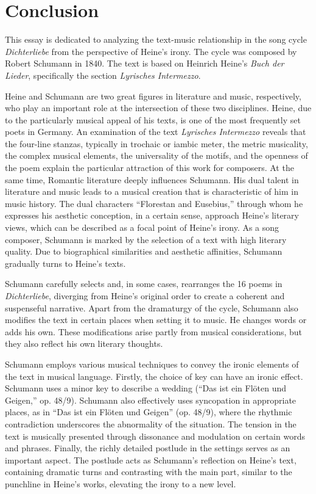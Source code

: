 \documentclass[10pt,a4paper,twocolumn]{rho}
\begin{document}
\section{Conclusion}
This essay is dedicated to analyzing the text-music relationship in the song cycle \textit{Dichterliebe} from the perspective of Heine's irony. The cycle was composed by Robert Schumann in 1840. The text is based on Heinrich Heine's \textit{Buch der Lieder}, specifically the section \textit{Lyrisches Intermezzo}.

Heine and Schumann are two great figures in literature and music, respectively, who play an important role at the intersection of these two disciplines. Heine, due to the particularly musical appeal of his texts, is one of the most frequently set poets in Germany. An examination of the text \textit{Lyrisches Intermezzo} reveals that the four-line stanzas, typically in trochaic or iambic meter, the metric musicality, the complex musical elements, the universality of the motifs, and the openness of the poem explain the particular attraction of this work for composers. At the same time, Romantic literature deeply influences Schumann. His dual talent in literature and music leads to a musical creation that is characteristic of him in music history. The dual characters “Florestan and Eusebius,” through whom he expresses his aesthetic conception, in a certain sense, approach Heine's literary views, which can be described as a focal point of Heine's irony. As a song composer, Schumann is marked by the selection of a text with high literary quality. Due to biographical similarities and aesthetic affinities, Schumann gradually turns to Heine's texts.

Schumann carefully selects and, in some cases, rearranges the 16 poems in \textit{Dichterliebe}, diverging from Heine's original order to create a coherent and suspenseful narrative. Apart from the dramaturgy of the cycle, Schumann also modifies the text in certain places when setting it to music. He changes words or adds his own. These modifications arise partly from musical considerations, but they also reflect his own literary thoughts.

Schumann employs various musical techniques to convey the ironic elements of the text in musical language. Firstly, the choice of key can have an ironic effect. Schumann uses a minor key to describe a wedding (“Das ist ein Flöten und Geigen,” op. 48/9). Schumann also effectively uses syncopation in appropriate places, as in “Das ist ein Flöten und Geigen” (op. 48/9), where the rhythmic contradiction underscores the abnormality of the situation. The tension in the text is musically presented through dissonance and modulation on certain words and phrases. Finally, the richly detailed postlude in the settings serves as an important aspect. The postlude acts as Schumann's reflection on Heine's text, containing dramatic turns and contrasting with the main part, similar to the punchline in Heine's works, elevating the irony to a new level.
\end{document}

